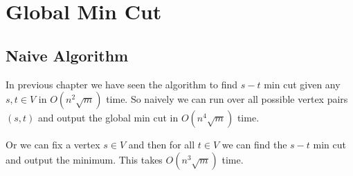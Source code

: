 \chapter{Global Min Cut}
\begin{algoprob}
\end{algoprob}
\section{Naive Algorithm}
In previous chapter we have seen the algorithm to find $s-t$ min cut given any $s,t\in V$ in $O(n^2\sqrt{m})$ time. So naively we can run over all possible vertex pairs $(s,t)$ and output the global min cut in $O(n^4\sqrt{m})$ time.

Or we can fix a vertex $s\in V$ and then for all $t\in V$ we can find the $s-t$ min cut and output the minimum. This takes $O(n^3\sqrt{m})$ time.
